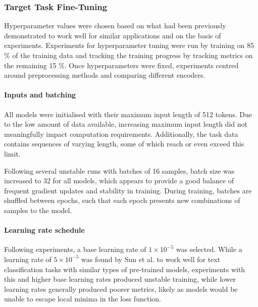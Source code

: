 \documentclass[12pt]{report}
\begin{document}
\subsubsection{Target Task Fine-Tuning}
Hyperparameter values were chosen based on what had been previously demonstrated to work well for similar applications and on the basis of experiments.
Experiments for hyperparameter tuning were run by training on 85 \% of the training data and tracking the training progress by tracking metrics on the remaining 15 \%.
Once hyperparameters were fixed, experiments centred around preprocessing methods and comparing different encoders.

\paragraph*{Inputs and batching}
All models were initialised with their maximum input length of 512 tokens.
Due to the low amount of data available, increasing maximum input length did not meaningfully impact computation requirements.
Additionally, the task data contains sequences of varying length, some of which reach or even exceed this limit.

Following several unstable runs with batches of 16 samples, batch size was increased to 32 for all models, which appears to provide a good balance of frequent gradient updates and stability in training.
During training, batches are shuffled between epochs, such that each epoch presents new combinations of samples to the model.

\paragraph*{Learning rate schedule}
Following experiments, a base learning rate of $1 \times 10^{-5}$ was selected.
While a learning rate of $5 \times 10^{-5}$ was found by Sun et al. \citeyear{Sun2020} to work well for text classification tasks with similar types of pre-trained models, experiments with this and higher base learning rates produced unstable training, while lower learning rates generally produced poorer metrics, likely as models would be unable to escape local minima in the loss function.
\end{document}
